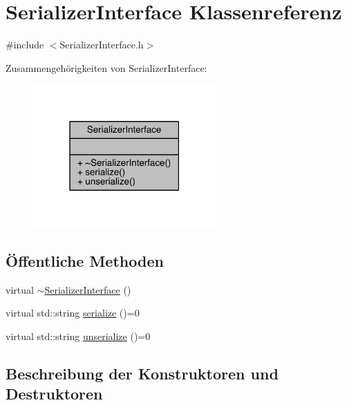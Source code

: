 \hypertarget{class_serializer_interface}{}\section{Serializer\+Interface Klassenreferenz}
\label{class_serializer_interface}


{\ttfamily \#include $<$Serializer\+Interface.\+h$>$}



Zusammengehörigkeiten von Serializer\+Interface\+:
\nopagebreak
\begin{figure}[H]
\begin{center}
\leavevmode
\includegraphics[width=198pt]{class_serializer_interface__coll__graph}
\end{center}
\end{figure}
\subsection*{Öffentliche Methoden}
\begin{DoxyCompactItemize}
\item 
virtual \hyperlink{class_serializer_interface_aea8141688fdd8721b178c181d25820e2}{$\sim$\+Serializer\+Interface} ()
\item 
virtual std\+::string \hyperlink{class_serializer_interface_a7ca657af272daca5396afd0c53f845a5}{serialize} ()=0
\item 
virtual std\+::string \hyperlink{class_serializer_interface_a0d3718721a1b03be94e5b3efb09c9f7b}{unserialize} ()=0
\end{DoxyCompactItemize}


\subsection{Beschreibung der Konstruktoren und Destruktoren}
\hypertarget{class_serializer_interface_aea8141688fdd8721b178c181d25820e2}{}\label{class_serializer_interface_aea8141688fdd8721b178c181d25820e2} 
